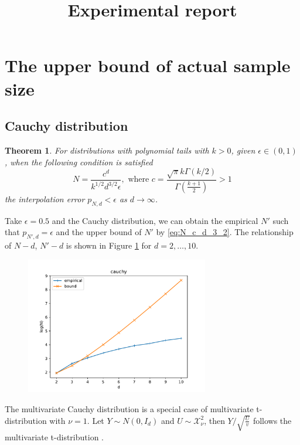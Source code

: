 \documentclass{article}
\title{Experimental report}
\newtheorem{theorem}{Theorem}
\begin{document}
\maketitle
\section{The upper bound of actual sample size}
\subsection{Cauchy distribution}
\begin{theorem}\label{thm:poly_tail_sample_complexity}
    For distributions with polynomial tails with $k>0$, given $\epsilon \in (0,1)$,
    when the following condition is satisfied
  \begin{equation}\label{eq:N_c_d_3_2}
    N = \frac{c^d}{k^{1/2}d^{3/2} \epsilon}, \textrm{ where } c=\frac{\sqrt{\pi}k\Gamma(k/2)}{\Gamma(\frac{k+1}{2})}>1  
  \end{equation}
  the interpolation error $p_{N,d} < \epsilon$ as $d\to \infty$.
  \end{theorem}
Take $\epsilon=0.5$ and the Cauchy distribution, we can obtain
the empirical $N'$ such that
$p_{N',d} = \epsilon$ and the upper bound of $N'$ by
\eqref{eq:N_c_d_3_2}. The relationship of $N-d$, $N'-d$ is shown in
Figure \ref{fig:cauchy} for $d=2,\dots, 10$.
\begin{figure}[!ht]
    \centering
    \includegraphics[width=8cm]{cauchy.pdf}
    \caption{}\label{fig:cauchy}
\end{figure}

The multivariate Cauchy distribution is a special case
of multivariate t-distribution with $\nu=1$.
Let $Y\sim N(0,I_d)$
and $U\sim \mathcal{X}_{\nu}^2$, then
$Y/\sqrt{\frac{U}{v}}$ follows the multivariate t-distribution
\cite{mtd}.
\end{document}
